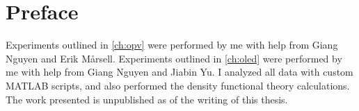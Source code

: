 
\chapter{Preface}

Experiments outlined in \autoref{ch:opv} were performed by me with help from Giang Nguyen and Erik M\aa rsell. Experiments outlined in \autoref{ch:oled} were performed by me with help from Giang Nguyen and Jiabin Yu. I analyzed all data with custom MATLAB scripts, and also performed the density functional theory calculations. The work presented is unpublished as of the writing of this thesis.